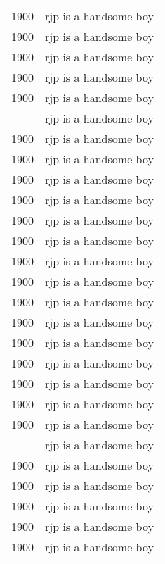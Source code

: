 \documentclass[a4paper, UTF8]{article}
\begin{document}
\begin{center}
\begin{longtable}{|c|c|}
        1900 & rjp is a handsome boy\\
        1900 & rjp is a handsome boy\\
        1900 & rjp is a handsome boy\\
        1900 & rjp is a handsome boy\\
        1900 & rjp is a handsome boy\\
        \newpage
        1900 & rjp is a handsome boy\\
        1900 & rjp is a handsome boy\\
        1900 & rjp is a handsome boy\\
        1900 & rjp is a handsome boy\\
        1900 & rjp is a handsome boy\\
        1900 & rjp is a handsome boy\\
        1900 & rjp is a handsome boy\\
        1900 & rjp is a handsome boy\\
        1900 & rjp is a handsome boy\\
        1900 & rjp is a handsome boy\\
        1900 & rjp is a handsome boy\\
        1900 & rjp is a handsome boy\\
        1900 & rjp is a handsome boy\\
        1900 & rjp is a handsome boy\\
        1900 & rjp is a handsome boy\\
        1900 & rjp is a handsome boy\\
        \newpage
        1900 & rjp is a handsome boy\\
        1900 & rjp is a handsome boy\\
        1900 & rjp is a handsome boy\\
        1900 & rjp is a handsome boy\\
        1900 & rjp is a handsome boy\\
        1900 & rjp is a handsome boy\\
        \hline
    \end{longtable}
\end{center}
\end{document}
